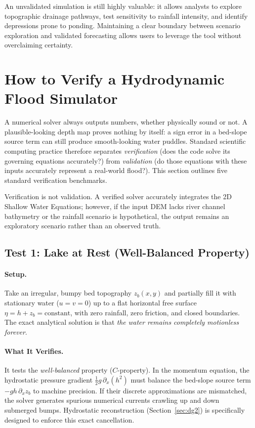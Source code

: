 \documentclass[11pt,a4paper]{article}
\begin{document}
\begin{intuicion}
An unvalidated simulation is still highly valuable: it allows analysts to explore topographic drainage pathways, test sensitivity to rainfall intensity, and identify depressions prone to ponding. Maintaining a clear boundary between scenario exploration and validated forecasting allows users to leverage the tool without overclaiming certainty.
\end{intuicion}


\section{How to Verify a Hydrodynamic Flood Simulator}
\label{sec:verificacion}

A numerical solver always outputs numbers, whether physically sound or not. A plausible-looking depth map proves nothing by itself: a sign error in a bed-slope source term can still produce smooth-looking water puddles. Standard scientific computing practice therefore separates \emph{verification} (does the code solve its governing equations accurately?) from \emph{validation} (do those equations with these inputs accurately represent a real-world flood?). This section outlines five standard verification benchmarks.

\begin{atencion}
Verification is not validation. A verified solver accurately integrates the 2D Shallow Water Equations; however, if the input DEM lacks river channel bathymetry or the rainfall scenario is hypothetical, the output remains an exploratory scenario rather than an observed truth.
\end{atencion}

\subsection{Test 1: Lake at Rest (Well-Balanced Property)}

\paragraph{Setup.} Take an irregular, bumpy bed topography $z_b(x,y)$ and partially fill it with stationary water ($u=v=0$) up to a flat horizontal free surface $\eta = h + z_b = \text{constant}$, with zero rainfall, zero friction, and closed boundaries. The exact analytical solution is that \emph{the water remains completely motionless forever}.

\paragraph{What It Verifies.} It tests the \emph{well-balanced} property ($C$-property). In the momentum equation, the hydrostatic pressure gradient $\tfrac12 g\,\partial_x(h^2)$ must balance the bed-slope source term $-gh\,\partial_xz_b$ to machine precision. If their discrete approximations are mismatched, the solver generates spurious numerical currents crawling up and down submerged bumps. Hydrostatic reconstruction (Section~\ref{sec:dg2}) is specifically designed to enforce this exact cancellation.
\end{document}
